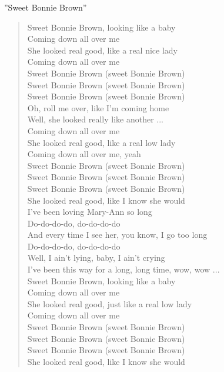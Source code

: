 ''Sweet Bonnie Brown''
\begin{verse}
Sweet Bonnie Brown, looking like a baby\\
Coming down all over me\\
She looked real good, like a real nice lady\\
Coming down all over me\\

Sweet Bonnie Brown (sweet Bonnie Brown)\\
Sweet Bonnie Brown (sweet Bonnie Brown)\\
Sweet Bonnie Brown (sweet Bonnie Brown)\\
Oh, roll me over, like I'm coming home\\

Well, she looked really like another ...\\
Coming down all over me\\
She looked real good, like a real low lady\\
Coming down all over me, yeah\\

Sweet Bonnie Brown (sweet Bonnie Brown)\\
Sweet Bonnie Brown (sweet Bonnie Brown)\\
Sweet Bonnie Brown (sweet Bonnie Brown)\\
She looked real good, like I know she would\\

I've been loving Mary-Ann so long\\
Do-do-do-do, do-do-do-do\\
And every time I see her, you know, I go too long\\
Do-do-do-do, do-do-do-do\\
Well, I ain't lying, baby, I ain't crying\\
I've been this way for a long, long time, wow, wow ...\\

Sweet Bonnie Brown, looking like a baby\\
Coming down all over me\\
She looked real good, just like a real low lady\\
Coming down all over me\\

Sweet Bonnie Brown (sweet Bonnie Brown)\\
Sweet Bonnie Brown (sweet Bonnie Brown)\\
Sweet Bonnie Brown (sweet Bonnie Brown)\\
She looked real good, like I know she would\\


\end{verse}
